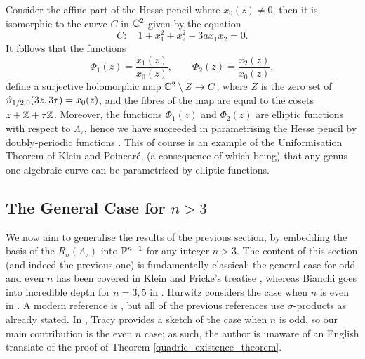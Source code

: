 \begin{remark}
	Consider the affine part of the Hesse pencil where $x_{0}(z) \neq 0$, then it is isomorphic to the curve $C$ in $\mathbb{C}^{2}$ given by the equation
	\begin{equation*}
	C:\quad 1 + x_{1}^{2} + x_{2}^{2} - 3ax_{1}x_{2} = 0.
	\end{equation*}
	It follows that the functions
	\begin{equation*}
	\Phi_{1}(z) = \frac{x_{1}(z)}{x_{0}(z)},\qquad \Phi_{2}(z) = \frac{x_{2}(z)}{x_{0}(z)},
	\end{equation*}
	define a surjective holomorphic map $\mathbb{C}^{2}\setminus Z \rightarrow C$, where $Z$ is the zero set of $\vartheta_{1/2,0}(3z,3\tau) = x_{0}(z)$, and the fibres of the map are equal to the cosets $z + \mathbb{Z} + \tau \mathbb{Z}$. Moreover, the functions $\Phi_{1}(z)$ and $\Phi_{2}(z)$ are elliptic functions with respect to $\Lambda_{\tau}$, hence we have succeeded in parametrising the Hesse pencil by doubly-periodic functions \cite{Dolgachev_1997}. This of course is an example of the Uniformisation Theorem of Klein and Poincar{\'e}, (a consequence of which being) that any genus one algebraic curve can be parametrised by elliptic functions.
\end{remark}





\subsection{The General Case for $n > 3$}

We now aim to generalise the results of the previous section, by embedding the basis of the $R_{n}(\Lambda_{\tau})$ into $\mathbb{P}^{n-1}$ for any integer $n > 3$. The content of this section (and indeed the previous one) is fundamentally classical; the general case for odd and even $n$ has been covered in Klein and Fricke's treatise \cite{KF_1892}, whereas Bianchi goes into incredible depth for $n =3,5$ in \cite{Bianchi_1880}. Hurwitz considers the case when $n$ is even in \cite{Hurtwiz_1886}. A modern reference is \cite{Hulek_1983}, but all of the previous references use $\sigma$-products as already stated. In \cite{Tracy_1985}, Tracy provides a sketch of the case when $n$ is odd, so our main contribution is the even $n$ case; as such, the author is unaware of an English translate of the proof of Theorem \ref{quadric_existence_theorem}.

